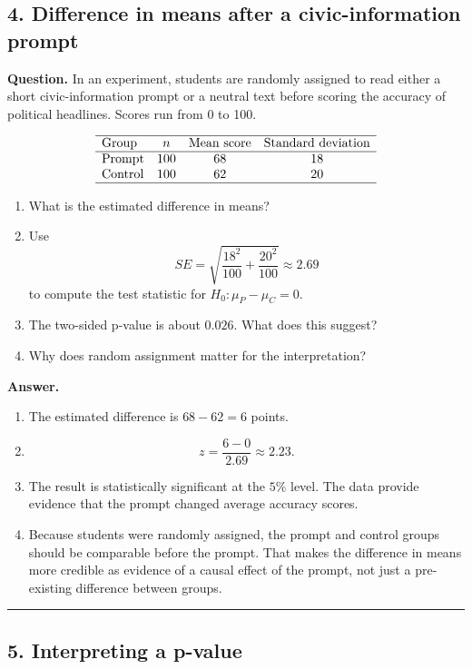 \documentclass[12pt]{article}
\begin{document}
\subsection*{4. Difference in means after a civic-information prompt}

\noindent
\textbf{Question.}
In an experiment, students are randomly assigned to read either a short civic-information prompt or a neutral text before scoring the accuracy of political headlines. Scores run from 0 to 100.

\[
\begin{array}{lccc}
\hline
\text{Group} & n & \text{Mean score} & \text{Standard deviation}\\
\hline
\text{Prompt} & 100 & 68 & 18\\
\text{Control} & 100 & 62 & 20\\
\hline
\end{array}
\]

\begin{enumerate}[label=(\alph*)]
\item What is the estimated difference in means?
\item Use
\[
SE = \sqrt{\frac{18^2}{100}+\frac{20^2}{100}} \approx 2.69
\]
to compute the test statistic for $H_0:\mu_P-\mu_C=0$.
\item The two-sided p-value is about $0.026$. What does this suggest?
\item Why does random assignment matter for the interpretation?
\end{enumerate}

\noindent
\textbf{Answer.}
\begin{enumerate}[label=(\alph*)]
\item The estimated difference is $68-62=6$ points.
\item
\[
z=\frac{6-0}{2.69}\approx 2.23.
\]
\item The result is statistically significant at the $5\%$ level. The data provide evidence that the prompt changed average accuracy scores.
\item Because students were randomly assigned, the prompt and control groups should be comparable before the prompt. That makes the difference in means more credible as evidence of a causal effect of the prompt, not just a pre-existing difference between groups.
\end{enumerate}

\hrule

\subsection*{5. Interpreting a p-value}
\end{document}
